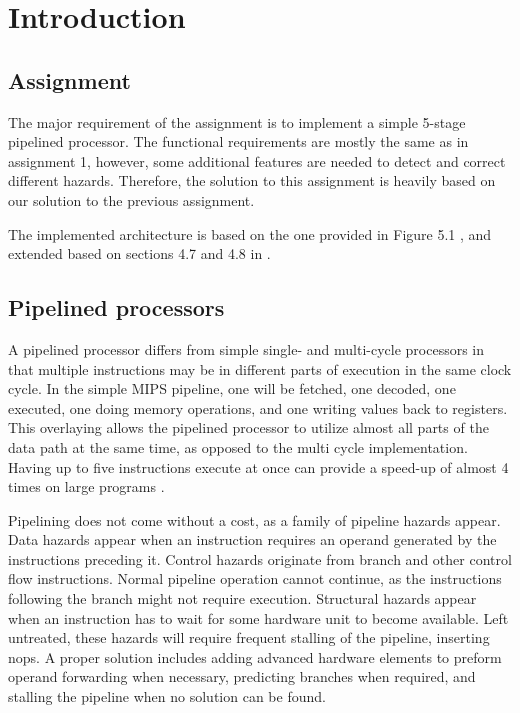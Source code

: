 \chapter{Introduction}

\section{Assignment}
The major requirement of the assignment is to implement a simple 5-stage pipelined processor.
The functional requirements are mostly the same as in assignment 1\cite[p.44]{compendium}, however, some additional features are needed to detect and correct different hazards.
Therefore, the solution to this assignment is heavily based on our solution to the previous assignment\cite{report-1}.

The implemented architecture is based on the one provided in Figure 5.1 \cite[p.50]{compendium},
and extended based on sections 4.7 and 4.8 in \cite{thebook}.

\section{Pipelined processors}

A pipelined processor differs from simple single- and multi-cycle processors in that multiple instructions may be in different parts of execution in the same clock cycle.
In the simple MIPS pipeline, one will be fetched, one decoded, one executed, one doing memory operations, and one writing values back to registers.
This overlaying allows the pipelined processor to utilize almost all parts of the data path at the same time, as opposed to the multi cycle implementation.
Having up to five instructions execute at once can provide a speed-up of almost 4 times on large programs \cite[p.276]{thebook}.

Pipelining does not come without a cost, as a family of pipeline hazards appear.
Data hazards appear when an instruction requires an operand generated by the instructions preceding it.
Control hazards originate from branch and other control flow instructions.
Normal pipeline operation cannot continue, as the instructions following the branch might not require execution.
Structural hazards appear when an instruction has to wait for some hardware unit to become available.
Left untreated, these hazards will require frequent stalling of the pipeline, inserting nops.
A proper solution includes adding advanced hardware elements to preform operand forwarding when necessary, predicting branches when required, and stalling the pipeline when no solution can be found.


